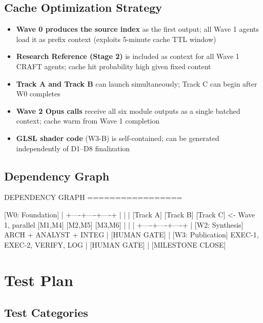 \documentclass[11pt,letterpaper]{article}
\begin{document}
\subsection{Cache Optimization Strategy}

\begin{itemize}[leftmargin=*]
  \item \textbf{Wave 0 produces the source index} as the first output; all Wave 1 agents load it as prefix context (exploits 5-minute cache TTL window)
  \item \textbf{Research Reference (Stage 2)} is included as context for all Wave 1 CRAFT agents; cache hit probability high given fixed content
  \item \textbf{Track A and Track B} can launch simultaneously; Track C can begin after W0 completes
  \item \textbf{Wave 2 Opus calls} receive all six module outputs as a single batched context; cache warm from Wave 1 completion
  \item \textbf{GLSL shader code} (W3-B) is self-contained; can be generated independently of D1--D8 finalization
\end{itemize}

\subsection{Dependency Graph}

\begin{asciibox}
DEPENDENCY GRAPH
=================

  [W0: Foundation]
         |
    +----+----+----+
    |         |    |
[Track A]  [Track B]  [Track C]      <- Wave 1, parallel
[M1,M4]    [M2,M5]   [M3,M6]
    |         |    |
    +----+----+----+
         |
  [W2: Synthesis]
  ARCH + ANALYST + INTEG
         |
    [HUMAN GATE]
         |
  [W3: Publication]
  EXEC-1, EXEC-2, VERIFY, LOG
         |
    [HUMAN GATE]
         |
  [MILESTONE CLOSE]
\end{asciibox}

\section{Test Plan}

\subsection{Test Categories}
\end{document}
